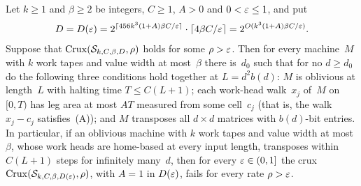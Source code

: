 \begin{corollary}\label{cor:B}
\notformalized
Let $k\ge1$ and $\beta\ge2$ be integers, $C\ge1$, $A>0$ and $0<\varepsilon\le1$, and put
\[
  D=D(\varepsilon)=2^{\lceil456k^3(1+A)\beta C/\varepsilon\rceil}\cdot\lceil4\beta C/\varepsilon\rceil=2^{O(k^3(1+A)\beta C/\varepsilon)}.
\]
Suppose that $\mathrm{Crux}(\mathcal S_{k,C,\beta,D},\rho)$ holds for some $\rho>\varepsilon$. Then for every machine~$M$ with $k$
work tapes and value width at most~$\beta$ there is~$d_0$ such that for no $d\ge d_0$ do the following three
conditions hold together at $L=d^2b(d)$: $M$ is oblivious at length~$L$ with halting time $T\le C(L+1)$; each
work-head walk~$x_j$ of~$M$ on $[0,T)$ has leg area at most $AT$ measured from some cell~$c_j$ (that is, the walk
$x_j-c_j$ satisfies~(A)); and $M$ transposes all $d\times d$ matrices with $b(d)$-bit entries. In particular, if an
oblivious machine with $k$ work tapes and value width at most~$\beta$, whose work heads are home-based at every input
length, transposes within $C(L+1)$ steps for infinitely many~$d$, then for every $\varepsilon\in(0,1]$ the crux
$\mathrm{Crux}(\mathcal S_{k,C,\beta,D(\varepsilon)},\rho)$, with $A=1$ in $D(\varepsilon)$, fails for every rate $\rho>\varepsilon$.
\end{corollary}

